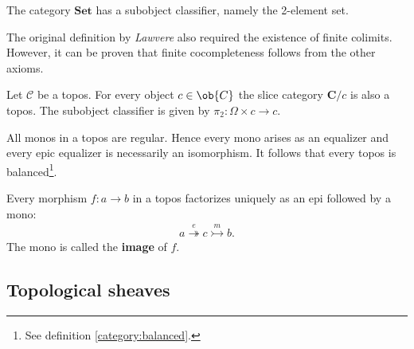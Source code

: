     \begin{example}
        The category $\mathbf{Set}$ has a subobject classifier, namely the 2-element set.
    \end{example}


    \begin{remark}
        The original definition by \textit{Lawvere} also required the existence of finite colimits. However, it can be proven that finite cocompleteness follows from the other axioms.
    \end{remark}

    \begin{example}
        Let $\mathcal{C}$ be a topos. For every object $c\in\ob{C}$ the slice category $\mathbf{C}/c$ is also a topos. The subobject classifier is given by $\pi_2:\Omega\times c\rightarrow c$.
    \end{example}

    \begin{property}[Balanced]
        All monos in a topos are regular. Hence every mono arises as an equalizer and every epic equalizer is necessarily an isomorphism. It follows that every topos is balanced\footnote{See definition \ref{category:balanced}.}.
    \end{property}

    \begin{property}
        Every morphism $f:a\rightarrow b$ in a topos factorizes uniquely as an epi followed by a mono:
        \begin{gather}
            a\overset{e}{\twoheadrightarrow} c\overset{m}{\rightarrowtail} b.
        \end{gather}
        The mono is called the \textbf{image} of $f$.
    \end{property}

\subsection{Topological sheaves}

